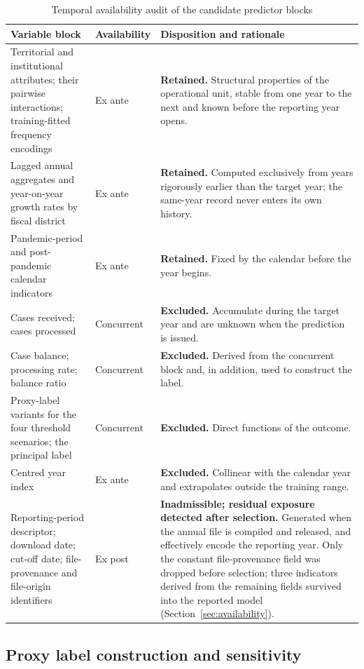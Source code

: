 \documentclass[sn-vancouver,Numbered]{sn-jnl}
\newcommand{\vr}{\rule{0pt}{2.4ex}}
\begin{document}
\begin{table}[h]
\caption{Temporal availability audit of the candidate predictor blocks}\label{tab:availability}
\begin{tabular}{p{3.1cm}p{2.0cm}p{6.1cm}}
\toprule
Variable block & Availability & Disposition and rationale \\
\midrule
\vr Territorial and institutional attributes; their pairwise interactions; training-fitted frequency encodings & Ex ante & \textbf{Retained.} Structural properties of the operational unit, stable from one year to the next and known before the reporting year opens. \\
\vr Lagged annual aggregates and year-on-year growth rates by fiscal district & Ex ante & \textbf{Retained.} Computed exclusively from years rigorously earlier than the target year; the same-year record never enters its own history. \\
\vr Pandemic-period and post-pandemic calendar indicators & Ex ante & \textbf{Retained.} Fixed by the calendar before the year begins. \\
\vr Cases received; cases processed & Concurrent & \textbf{Excluded.} Accumulate during the target year and are unknown when the prediction is issued. \\
\vr Case balance; processing rate; balance ratio & Concurrent & \textbf{Excluded.} Derived from the concurrent block and, in addition, used to construct the label. \\
\vr Proxy-label variants for the four threshold scenarios; the principal label & Concurrent & \textbf{Excluded.} Direct functions of the outcome. \\
\vr Centred year index & Ex ante & \textbf{Excluded.} Collinear with the calendar year and extrapolates outside the training range. \\
\vr Reporting-period descriptor; download date; cut-off date; file-provenance and file-origin identifiers & Ex post & \textbf{Inadmissible; residual exposure detected after selection.} Generated when the annual file is compiled and released, and effectively encode the reporting year. Only the constant file-provenance field was dropped before selection; three indicators derived from the remaining fields survived into the reported model (Section~\ref{sec:availability}). \\
\bottomrule
\end{tabular}
\end{table}

\subsection{Proxy label construction and sensitivity}\label{sec:target}
\end{document}
